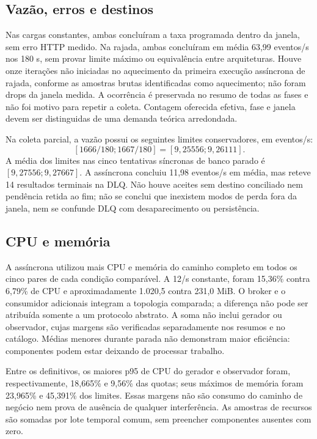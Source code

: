 \subsection{Vazão, erros e destinos}


Nas cargas constantes, ambas concluíram a taxa programada dentro da janela, sem erro HTTP medido. Na rajada, ambas concluíram em média 63,99 eventos/s nos 180 s, sem provar limite máximo ou equivalência entre arquiteturas. Houve onze iterações não iniciadas no aquecimento da primeira execução assíncrona de rajada, conforme as amostras brutas identificadas como aquecimento; não foram drops da janela medida. A ocorrência é preservada no resumo de todas as fases e não foi motivo para repetir a coleta. Contagem oferecida efetiva, fase e janela devem ser distinguidas de uma demanda teórica arredondada.

Na coleta parcial, a vazão possui os seguintes limites conservadores, em eventos/s:
\[
 [1666/180;1667/180]=[9{,}25556;9{,}26111].
\]
A média dos limites nas cinco tentativas síncronas de banco parado é $[9{,}27556;9{,}27667]$. A assíncrona concluiu 11,98 eventos/s em média, mas reteve 14 resultados terminais na DLQ. Não houve aceites sem destino conciliado nem pendência retida ao fim; não se conclui que inexistem modos de perda fora da janela, nem se confunde DLQ com desaparecimento ou persistência.

\subsection{CPU e memória}

A assíncrona utilizou mais CPU e memória do caminho completo em todos os cinco pares de cada condição comparável. A 12/s constante, foram 15,36\% contra 6,79\% de CPU e aproximadamente 1.020,5 contra 231,0 MiB. O broker e o consumidor adicionais integram a topologia comparada; a diferença não pode ser atribuída somente a um protocolo abstrato. A soma não inclui gerador ou observador, cujas margens são verificadas separadamente nos resumos e no catálogo. Médias menores durante parada não demonstram maior eficiência: componentes podem estar deixando de processar trabalho.

Entre os definitivos, os maiores p95 de CPU do gerador e observador foram, respectivamente, 18,665\% e 9,56\% das quotas; seus máximos de memória foram 23,965\% e 45,391\% dos limites. Essas margens não são consumo do caminho de negócio nem prova de ausência de qualquer interferência. As amostras de recursos são somadas por lote temporal comum, sem preencher componentes ausentes com zero.

